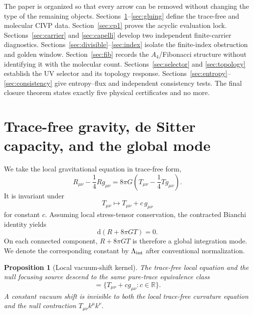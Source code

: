 \documentclass[aps,prd,preprint,nofootinbib,superscriptaddress]{revtex4-2}
\newtheorem{proposition}[theorem]{Proposition}
\theoremstyle{definition}
\theoremstyle{remark}
\newcommand{\dd}{\mathrm d}
\begin{document}
The paper is organized so that every arrow can be removed without changing the type of the remaining objects.  Sections~\ref{sec:tracefree}--\ref{sec:gluing} define the trace-free and molecular CIVP data.  Section~\ref{sec:cp1} proves the acyclic evaluation lock.  Sections~\ref{sec:carrier} and \ref{sec:capelli} develop two independent finite-carrier diagnostics.  Sections~\ref{sec:divisible}--\ref{sec:index} isolate the finite-index obstruction and golden window.  Section~\ref{sec:fib} records the $A_4$/Fibonacci structure without identifying it with the molecular count.  Sections~\ref{sec:selector} and \ref{sec:topology} establish the UV selector and its topology response.  Sections~\ref{sec:entropy}--\ref{sec:consistency} give entropy--flux and independent consistency tests.  The final closure theorem states exactly five physical certificates and no more.

\section{Trace-free gravity, de Sitter capacity, and the global mode}
\label{sec:tracefree}

We take the local gravitational equation in trace-free form,
\begin{equation}
R_{\mu\nu}-\frac14Rg_{\mu\nu}
=
8\pi G\left(
T_{\mu\nu}-\frac14Tg_{\mu\nu}
\right).
\label{eq:tf}
\end{equation}
It is invariant under
\begin{equation}
T_{\mu\nu}\mapsto T_{\mu\nu}+c\,g_{\mu\nu}
\label{eq:vacshift}
\end{equation}
for constant $c$.  Assuming local stress-tensor conservation, the contracted Bianchi identity yields
\begin{equation}
\dd(R+8\pi G T)=0.
\label{eq:globalmode}
\end{equation}
On each connected component, $R+8\pi G T$ is therefore a global integration mode.  We denote the corresponding constant by $\Lambda_{\rm int}$ after conventional normalization.

\begin{proposition}[Local vacuum-shift kernel]
The trace-free local equation and the null focusing source descend to the same pure-trace equivalence class
\begin{equation}
[T_{\mu\nu}]
=
\{T_{\mu\nu}+c g_{\mu\nu}:c\in\mathbb R\}.
\end{equation}
A constant vacuum shift is invisible to both the local trace-free curvature equation and the null contraction $T_{\mu\nu}k^\mu k^\nu$.
\end{proposition}
\end{document}
